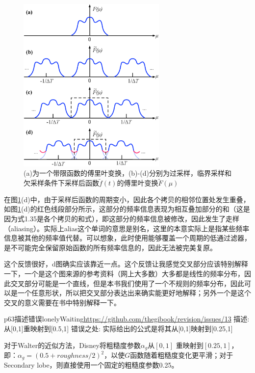 \begin{figure}
\renewcommand\thefigure{1.33}
	\sidecaption
	\includegraphics[width=0.65\textwidth]{figures/intro/sampling-aliasing}
	\caption{(a)为一个带限函数的傅里叶变换，(b)-(d)分别为过采样，临界采样和欠采样条件下采样后函数$\tilde{f}(t)$的傅里叶变换$\tilde{F}(\mu)$}
	\label{f:intro-sampling-aliasing}
\end{figure}

在图\ref{f:intro-sampling-aliasing}(d)中，由于采样后函数的周期变小，因此各个拷贝的相邻位置处发生重叠，如图\ref{f:intro-sampling-aliasing}(d)的红色线段部分所示，这部分的频率信息表现为相互叠加部分的和（这是因为式1.35是各个拷贝的和式），即这部分的频率信息被修改，因此发生了走样（aliasing）。实际上alias这个单词的意思是别名，这里的本意实际上是指某些频率信息被其他的频率值代替。可以想象，此时使用能够覆盖一个周期的低通过滤器，是不可能完全保留原始函数的所有频率信息的，因此无法被完美复原。

\begin{myshaded}
	这个反馈很好，d图确实应该靠近一点。这个反馈让我感觉交叉部分应该特别解释一下，一个是这个图来源的参考资料（网上大多数）大多都是线性的频率分布，因此交叉部分可能是一个直线，但是本书我们使用了一个不规则的频率分布，因此可以是一个任意形状，所以把交叉部分表达出来确实能更好地解释；另外一个是这个交叉的意义需要在书中特别解释一下。
\end{myshaded}



\begin{revision}{p63}{描述错误}{lonelyWaiting}{\url{https://github.com/thegibook/revision/issues/13}}
描述: 从[0,1]重映射到[0.5,1]
错误之处: 实际给出的公式是将其从[0,1]映射到[0.25,1]
\end{revision}
\noindent 对于Walter的近似方法，Disney将粗糙度参数$\alpha_g$从$[0,1]$ 重映射到$[0.25,1]$，即：$\alpha_g=(0.5+roughness/2)^2$，以使$G$函数随着粗糙度变化更平滑；对于Secondary lobe，则直接使用一个固定的粗糙度参数0.25。



